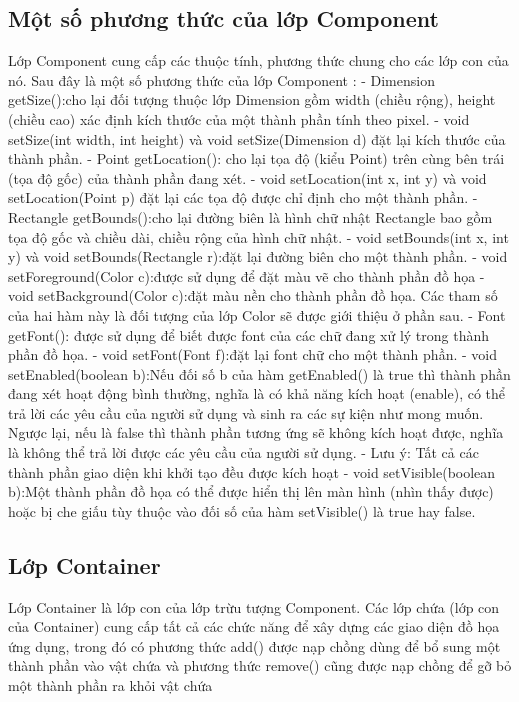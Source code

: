 \subsection{Một số phương thức của lớp Component}
Lớp Component cung cấp các thuộc tính, phương thức chung cho các lớp
con của nó. Sau đây là một số phương thức của lớp Component :
- Dimension getSize():cho lại đối tượng thuộc lớp Dimension gồm width (chiều
rộng), height (chiều cao) xác định kích thước của một thành phần tính theo pixel.
- void setSize(int width, int height) và void setSize(Dimension d) đặt lại kích
thước của thành phần.
- Point getLocation(): cho lại tọa độ (kiểu Point) trên cùng bên trái (tọa độ gốc)
của thành phần đang xét.
- void setLocation(int x, int y) và void setLocation(Point p) đặt lại các tọa độ được
chỉ định cho một thành phần.
- Rectangle getBounds():cho lại đường biên là hình chữ nhật Rectangle bao gồm
tọa độ gốc và chiều dài, chiều rộng của hình chữ nhật.
- void setBounds(int x, int y) và void setBounds(Rectangle r):đặt lại đường biên
cho một thành phần.
- void setForeground(Color c):được sử dụng để đặt màu vẽ cho thành phần đồ họa
- void setBackground(Color c):đặt màu nền cho thành phần đồ họa. Các tham số
của hai hàm này là đối tượng của lớp Color sẽ được giới thiệu ở phần sau.
- Font getFont(): được sử dụng để biết được font của các chữ đang xử lý trong
thành phần đồ họa.
- void setFont(Font f):đặt lại font chữ cho một thành phần.
- void setEnabled(boolean b):Nếu đối số b của hàm getEnabled() là true thì thành
phần đang xét hoạt động bình thường, nghĩa là có khả năng kích hoạt (enable), có
thể trả lời các yêu cầu của người sử dụng và sinh ra các sự kiện như mong muốn.
Ngược lại, nếu là false thì thành phần tương ứng sẽ không kích hoạt được, nghĩa là
không thể trả lời được các yêu cầu của người sử dụng.
- Lưu ý: Tất cả các thành phần giao diện khi khởi tạo đều được kích hoạt
- void setVisible(boolean b):Một thành phần đồ họa có thể được hiển thị lên màn
hình (nhìn thấy được) hoặc bị che giấu tùy thuộc vào đối số của hàm setVisible()
là true hay false.
\subsection{ Lớp Container}
Lớp Container là lớp con của lớp trừu tượng Component. Các lớp chứa (lớp
con của Container) cung cấp tất cả các chức năng để xây dựng các giao diện đồ
họa ứng dụng, trong đó có phương thức add() được nạp chồng dùng để bổ sung
một thành phần vào vật chứa và phương thức remove() cũng được nạp chồng để
gỡ bỏ một thành phần ra khỏi vật chứa
